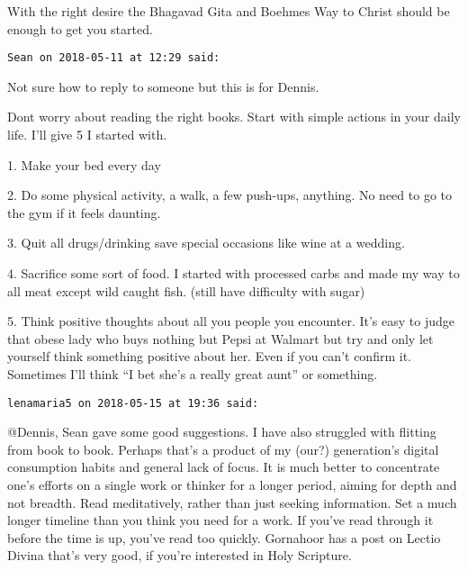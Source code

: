 \begin{footnotesize}
\begin{sffamily}
With the right desire the Bhagavad Gita and Boehmes Way to Christ should be enough to get you started.


\hfill

\texttt{Sean on 2018-05-11 at 12:29 said: }

Not sure how to reply to someone but this is for Dennis.

Dont worry about reading the right books. Start with simple actions in your daily life. I'll give 5 I started with. 

1. Make your bed every day

2. Do some physical activity, a walk, a few push-ups, anything. No need to go to the gym if it feels daunting.

3. Quit all drugs/drinking save special occasions like wine at a wedding.

4. Sacrifice some sort of food. I started with processed carbs and made my way to all meat except wild caught fish. (still have difficulty with sugar)

5. Think positive thoughts about all you people you encounter. It's easy to judge that obese lady who buys nothing but Pepsi at Walmart but try and only let yourself think something positive about her. Even if you can't confirm it. Sometimes I'll think “I bet she's a really great aunt” or something.


\hfill

\texttt{lenamaria5 on 2018-05-15 at 19:36 said: }

@Dennis, Sean gave some good suggestions. I have also struggled with flitting from book to book. Perhaps that's a product of my (our?) generation's digital consumption habits and general lack of focus. It is much better to concentrate one's efforts on a single work or thinker for a longer period, aiming for depth and not breadth. Read meditatively, rather than just seeking information. Set a much longer timeline than you think you need for a work. If you've read through it before the time is up, you've read too quickly. Gornahoor has a post on Lectio Divina that's very good, if you're interested in Holy Scripture.


\end{sffamily}\end{footnotesize}
